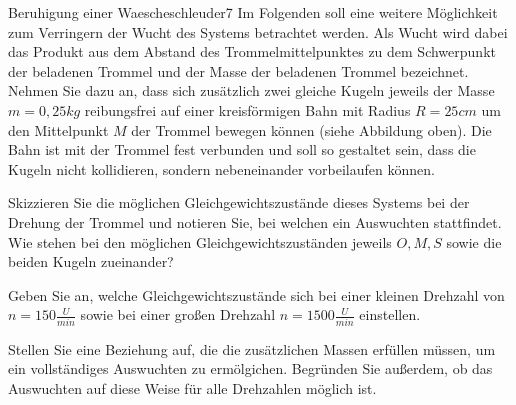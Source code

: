 \begin{problem}{Beruhigung einer Waescheschleuder}{7}
Im Folgenden soll eine weitere Möglichkeit zum Verringern der Wucht des Systems betrachtet werden.  Als Wucht wird dabei das Produkt aus dem Abstand des Trommelmittelpunktes zu dem Schwerpunkt der beladenen Trommel und der Masse der beladenen Trommel bezeichnet.  Nehmen Sie dazu an, dass sich zusätzlich zwei gleiche Kugeln jeweils der Masse $m=0,25\unit{kg}$ reibungsfrei auf einer kreisförmigen Bahn mit Radius $R=25\unit{cm}$ um den Mittelpunkt $M$ der Trommel bewegen können (siehe Abbildung oben). Die Bahn ist mit der Trommel fest verbunden und soll so gestaltet sein, dass die Kugeln nicht kollidieren, sondern nebeneinander vorbeilaufen können.

\begin{abcenum}
  \item Skizzieren Sie die möglichen Gleichgewichtszustände dieses Systems bei der Drehung der Trommel und notieren Sie, bei welchen ein Auswuchten stattfindet.  Wie stehen bei den möglichen Gleichgewichtszuständen jeweils $O, M, S$ sowie die beiden Kugeln zueinander?
  \item Geben Sie an, welche Gleichgewichtszustände sich bei einer kleinen Drehzahl von $n=150\unit{\frac{U}{min}}$ sowie bei einer großen Drehzahl $n=1500\unit{\frac{U}{min}}$ einstellen.
  \item Stellen Sie eine Beziehung auf, die die zusätzlichen Massen erfüllen müssen, um ein vollständiges Auswuchten zu ermölgichen.  Begründen Sie außerdem, ob das Auswuchten auf diese Weise für alle Drehzahlen möglich ist.
\end{abcenum}

\end{problem}



